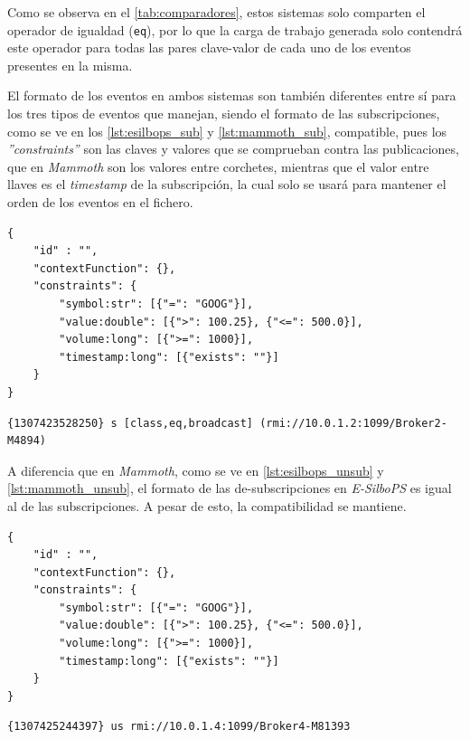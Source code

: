 Como se observa en el \autoref{tab:comparadores}, estos sistemas solo comparten el operador
de igualdad (\texttt{eq}), por lo que la carga de trabajo generada solo contendrá este operador 
para todas las pares clave-valor de cada uno de los eventos presentes en la misma.

El formato de los eventos en ambos sistemas son también diferentes entre sí para los tres tipos 
de eventos que manejan, siendo el formato de las subscripciones, como se ve en los
\autoref{lst:esilbops_sub} y \autoref{lst:mammoth_sub}, compatible, pues los 
\textit{''constraints''} son las claves y valores que se comprueban contra las publicaciones,
que en \textit{Mammoth} son los valores entre corchetes, mientras que el valor entre llaves es
el \textit{timestamp} de la subscripción, la cual solo se usará para mantener el orden de los
eventos en el fichero.\\

\begin{lstlisting}[caption={Ejemplo de subscripción de E-SilboPS.},label={lst:esilbops_sub}, style=consola,captionpos=b]
{
	"id" : "",
	"contextFunction": {},
	"constraints": {
		"symbol:str": [{"=": "GOOG"}],
		"value:double": [{">": 100.25}, {"<=": 500.0}],
		"volume:long": [{">=": 1000}],
		"timestamp:long": [{"exists": ""}]
	}
}
\end{lstlisting}

\begin{lstlisting}[caption={Ejemplo de subscripción de Mammoth.}, label={lst:mammoth_sub}, style=consola,captionpos=b]
{1307423528250} s [class,eq,broadcast] (rmi://10.0.1.2:1099/Broker2-M4894)
\end{lstlisting}

A diferencia que en \textit{Mammoth}, como se ve en \autoref{lst:esilbops_unsub} y 
\autoref{lst:mammoth_unsub}, el formato de las de-subscripciones en \textit{E-SilboPS} 
es igual al de las subscripciones. A pesar de esto, la compatibilidad se mantiene.

\begin{lstlisting}[caption={Ejemplo de de-subscripcion de E-SilboPS.},label={lst:esilbops_unsub},style=consola,captionpos=b]
{
	"id" : "",
	"contextFunction": {},
	"constraints": {
		"symbol:str": [{"=": "GOOG"}],
		"value:double": [{">": 100.25}, {"<=": 500.0}],
		"volume:long": [{">=": 1000}],
		"timestamp:long": [{"exists": ""}]
	}
}
\end{lstlisting}

\begin{lstlisting}[caption={Ejemplo de de-subscripción de Mammoth.},label={lst:mammoth_unsub},style=consola,captionpos=b]
{1307425244397} us rmi://10.0.1.4:1099/Broker4-M81393
\end{lstlisting}

